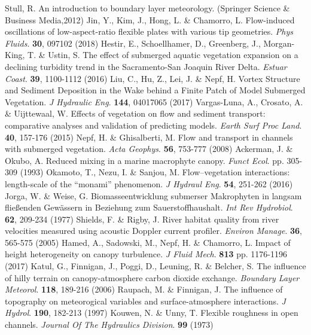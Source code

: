 \documentclass[lineno,authoryear]{FLO_v1}%
\theoremstyle{definition}
\begin{document}
\begin{Backmatter}
\begin{thebibliography}{}
Stull, R. An introduction to boundary layer meteorology. (Springer Science & Business Media,2012)
Jin, Y., Kim, J., Hong, L. \& Chamorro, L. Flow-induced oscillations of low-aspect-ratio flexible plates with various tip geometries. {\em Phys Fluids}. \textbf{30}, 097102 (2018)
Hestir, E., Schoellhamer, D., Greenberg, J., Morgan-King, T. \& Ustin, S. The effect of submerged aquatic vegetation expansion on a declining turbidity trend in the Sacramento-San Joaquin River Delta. {\em Estuar Coast}. \textbf{39}, 1100-1112 (2016)
Liu, C., Hu, Z., Lei, J. \& Nepf, H. Vortex Structure and Sediment Deposition in the Wake behind a Finite Patch of Model Submerged Vegetation. {\em J Hydraulic Eng}. \textbf{144}, 04017065 (2017)
Vargas-Luna, A., Crosato, A. \& Uijttewaal, W. Effects of vegetation on flow and sediment transport: comparative analyses and validation of predicting models. {\em Earth Surf Proc Land}. \textbf{40}, 157-176 (2015)
Nepf, H. \& Ghisalberti, M. Flow and transport in channels with submerged vegetation. {\em Acta Geophys}. \textbf{56}, 753-777 (2008)
Ackerman, J. \& Okubo, A. Reduced mixing in a marine macrophyte canopy. {\em Funct Ecol}. pp. 305-309 (1993)
Okamoto, T., Nezu, I. \& Sanjou, M. Flow–vegetation interactions: length-scale of the “monami” phenomenon. {\em J Hydraul Eng}. \textbf{54}, 251-262 (2016)
Jorga, W. \& Weise, G. Biomasseentwicklung submerser Makrophyten in langsam fließenden Gewässern in Beziehung zum Sauerstoffhaushalt. {\em Int Rev Hydrobiol}. \textbf{62}, 209-234 (1977)
Shields, F. \& Rigby, J. River habitat quality from river velocities measured using acoustic Doppler current profiler. {\em Environ Manage}. \textbf{36}, 565-575 (2005)
Hamed, A., Sadowski, M., Nepf, H. \& Chamorro, L. Impact of height heterogeneity on canopy turbulence. {\em J Fluid Mech}. \textbf{813} pp. 1176-1196 (2017)
Katul, G., Finnigan, J., Poggi, D., Leuning, R. \& Belcher, S. The influence of hilly terrain on canopy-atmosphere carbon dioxide exchange. {\em Boundary Layer Meteorol}. \textbf{118}, 189-216 (2006)
Raupach, M. \& Finnigan, J. The influence of topography on meteorogical variables and surface-atmosphere interactions. {\em J Hydrol}. \textbf{190}, 182-213 (1997)
Kouwen, N. \& Unny, T. Flexible roughness in open channels. {\em Journal Of The Hydraulics Division}. \textbf{99} (1973)

\end{thebibliography}
\end{Backmatter}
\end{document}
